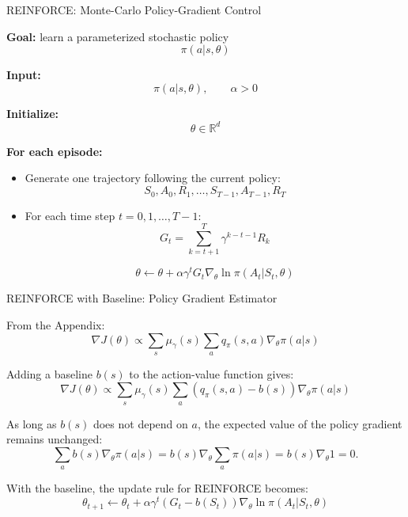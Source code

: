 \documentclass{beamer}
\begin{document}
\begin{frame}{REINFORCE: Monte-Carlo Policy-Gradient Control}

\small

\textbf{Goal:} learn a parameterized stochastic policy
\[
\pi(a|s,\theta)
\]

\vspace{0.15cm}

\textbf{Input:}
\[
\pi(a|s,\theta), \qquad \alpha > 0
\]

\vspace{0.15cm}

\textbf{Initialize:}
\[
\theta \in \mathbb{R}^d
\]

\vspace{0.15cm}

\textbf{For each episode:}

\begin{itemize}
    \item Generate one trajectory following the current policy:
    \[
    S_0, A_0, R_1, \ldots, S_{T-1}, A_{T-1}, R_T
    \]

    \item For each time step \(t = 0,1,\ldots,T-1\):
    \[
    G_t
    =
    \sum_{k=t+1}^{T}
    \gamma^{k-t-1} R_k
    \]

    \[
    \theta
    \leftarrow
    \theta
    +
    \alpha \gamma^t G_t
    \nabla_\theta \ln \pi(A_t|S_t,\theta)
    \]
\end{itemize}

\end{frame}

\begin{frame}{REINFORCE with Baseline: Policy Gradient Estimator}

\small

From the Appendix:
\[
\nabla J(\theta)
\propto
\sum_s \mu_\gamma(s)
\sum_a q_\pi(s,a)\nabla_\theta \pi(a|s)
\]

\vspace{0.1cm}

Adding a baseline \(b(s)\) to the action-value function gives:
\[
\nabla J(\theta)
\propto
\sum_s \mu_\gamma(s)
\sum_a
\left(q_\pi(s,a) - b(s)\right)
\nabla_\theta \pi(a|s)
\]

\vspace{0.1cm}

As long as \(b(s)\) does not depend on \(a\), the expected value of
the policy gradient remains unchanged:
\[
\sum_a b(s)\nabla_\theta \pi(a|s)
=
b(s)\nabla_\theta \sum_a \pi(a|s)
=
b(s)\nabla_\theta 1
=
0.
\]

\vspace{0.1cm}

With the baseline, the update rule for REINFORCE becomes:
\[
\theta_{t+1}
\leftarrow
\theta_t
+
\alpha \gamma^t
\left(G_t - b(S_t)\right)
\nabla_\theta \ln \pi(A_t|S_t,\theta)
\]

\end{frame}
\end{document}
